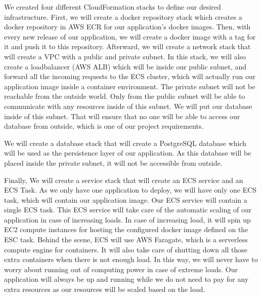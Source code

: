 We created four different CloudFormation stacks to define our desired infrastructure. First, we will create a docker repository stack which creates a docker repository in AWS ECR for our application's docker images. Then, with every new release of our application, we will create a docker image with a tag for it and push it to this repository. Afterward, we will create a network stack that will create a VPC with a public and private subnet. In this stack, we will also create a loadbalancer (AWS ALB) which will be inside our public subnet, and forward all the incoming requests to the ECS cluster, which will actually run our application image inside a container environment. The private subnet will not be reachable from the outside world. Only from the public subnet will be able to communicate with any resources inside of this subnet. We will put our database inside of this subnet. That will ensure that no one will be able to access our database from outside, which is one of our project requirements.

We will create a database stack that will create a PostgreSQL database which will be used as the persistence layer of our application. As this database will be placed inside the private subnet, it will not be accessible from outside.

Finally, We will create a service stack that will create an ECS service and an ECS Task. As we only have one application to deploy, we will have only one ECS task, which will contain our application image. Our ECS service will contain a single ECS task. This ECS service will take care of the automatic scaling of our application in case of increasing loads. In case of increasing load, it will spin up EC2 compute instances for hosting the configured docker image defined on the ESC task. Behind the scene, ECS will use AWS Faragate, which is a serverless compute engine for containers. It will also take care of shutting down all those extra containers when there is not enough load. In this way, we will never have to worry about running out of computing power in case of extreme loads. Our application will always be up and running while we do not need to pay for any extra resources as our resources will be scaled based on the load.

